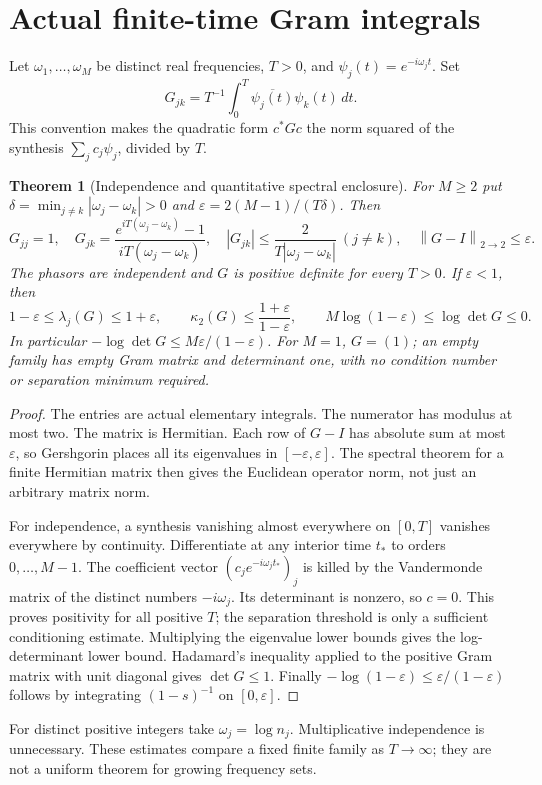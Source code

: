 \documentclass[11pt]{article}
\theoremstyle{readable}
\newtheorem{theorem}{Theorem}[section]
\theoremstyle{remark}\newtheorem{remark}[theorem]{Remark}
\newcommand{\dd}{\,d}\newcommand{\norm}[1]{\left\lVert#1\right\rVert}
\begin{document}
\section{Actual finite-time Gram integrals}\label{sec:gram}
Let $\omega_1,\ldots,\omega_M$ be distinct real frequencies, $T>0$,
and $\psi_j(t)=e^{-i\omega_jt}$. Set
\[
 G_{jk}=T^{-1}\int_0^T\overline{\psi_j(t)}\psi_k(t)\dd t.
\]
This convention makes the quadratic form $c^*Gc$ the norm squared of the
synthesis $\sum_jc_j\psi_j$, divided by $T$.
\begin{theorem}[Independence and quantitative spectral enclosure]
For $M\geq2$ put $\delta=\min_{j\ne k}|\omega_j-\omega_k|>0$ and
$\varepsilon=2(M-1)/(T\delta)$. Then
\[
 G_{jj}=1,\quad
 G_{jk}=\frac{e^{iT(\omega_j-\omega_k)}-1}{iT(\omega_j-\omega_k)},\quad
 |G_{jk}|\leq\frac{2}{T|\omega_j-\omega_k|}\ (j\ne k),\quad
 \norm{G-I}_{2\to2}\leq\varepsilon.
\]
The phasors are independent and $G$ is positive definite for every $T>0$.
If $\varepsilon<1$, then
\[
 1-\varepsilon\leq\lambda_j(G)\leq1+\varepsilon,\qquad
 \kappa_2(G)\leq\frac{1+\varepsilon}{1-\varepsilon},\qquad
 M\log(1-\varepsilon)\leq\log\det G\leq0.
\]
In particular $-\log\det G\leq M\varepsilon/(1-\varepsilon)$.
For $M=1$, $G=(1)$; an empty family has empty Gram matrix and determinant
one, with no condition number or separation minimum required.
\end{theorem}
\begin{proof}
The entries are actual elementary integrals. The numerator has modulus at
most two. The matrix is Hermitian. Each row of $G-I$ has absolute sum at
most $\varepsilon$, so Gershgorin places all its eigenvalues in
$[-\varepsilon,\varepsilon]$. The spectral theorem for a finite Hermitian
matrix then gives the Euclidean operator norm, not just an arbitrary
matrix norm.

For independence, a synthesis vanishing almost everywhere on $[0,T]$
vanishes everywhere by continuity. Differentiate at any interior time
$t_*$ to orders $0,\ldots,M-1$. The coefficient vector
$(c_je^{-i\omega_jt_*})_j$ is killed by the Vandermonde matrix of the
distinct numbers $-i\omega_j$. Its determinant is nonzero, so $c=0$.
This proves positivity for all positive $T$; the separation threshold is
only a sufficient conditioning estimate. Multiplying the eigenvalue lower
bounds gives the log-determinant lower bound. Hadamard's inequality applied
to the positive Gram matrix with unit diagonal gives $\det G\leq1$.
Finally $-\log(1-\varepsilon)\leq\varepsilon/(1-\varepsilon)$ follows by
integrating $(1-s)^{-1}$ on $[0,\varepsilon]$.
\end{proof}
For distinct positive integers take $\omega_j=\log n_j$. Multiplicative
independence is unnecessary. These estimates compare a fixed finite family
as $T\to\infty$; they are not a uniform theorem for growing frequency sets.
\end{document}
